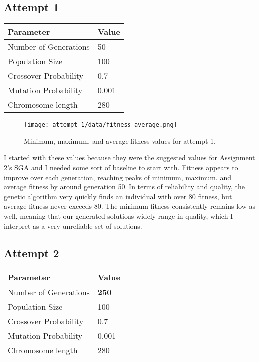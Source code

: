 \documentclass[12pt, letterpaper]{article}
\begin{document}
\subsection{Attempt 1}
\begin{center}
\begin{tabular}{p{} l}
    \toprule
    \textbf{Parameter}      & \textbf{Value}    \\ \midrule
    Number of Generations   & 50                \\
    Population Size         & 100               \\
    Crossover Probability   & 0.7               \\
    Mutation Probability    & 0.001             \\
    Chromosome length       & 280               \\ \bottomrule
\end{tabular}
\end{center}

\begin{figure}[H]
    \centerline{\texttt{[image: attempt-1/data/fitness-average.png]}}
    \caption{Minimum, maximum, and average fitness values for attempt 1.}\label{Fig:Attempt1Fitness}
\end{figure}

I started with these values because they were the suggested values for Assignment 2's SGA
and I needed some sort of baseline to start with.
Fitness appears to improve over each generation, reaching peaks of minimum, maximum, and average fitness by around generation 50.
In terms of reliability and quality, the genetic algorithm very quickly finds an individual with over 80 fitness,
but average fitness never exceeds 80.
The minimum fitness consistently remains low as well, meaning that our generated solutions widely range in quality,
which I interpret as a very unreliable set of solutions.

\subsection{Attempt 2}
\begin{center}
\begin{tabular}{p{} l}
    \toprule
    \textbf{Parameter}      & \textbf{Value}    \\ \midrule
    Number of Generations   & \textbf{250}      \\
    Population Size         & 100               \\
    Crossover Probability   & 0.7               \\
    Mutation Probability    & 0.001             \\
    Chromosome length       & 280               \\ \bottomrule
\end{tabular}
\end{center}
\end{document}
